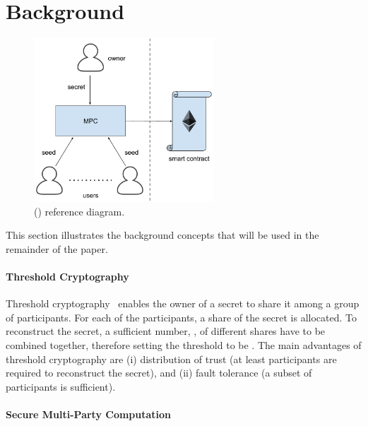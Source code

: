 \vspace*{-2pt}
\section{Background}\label{sect:background}

\begin{figure}[tp]
	\centering
	\includegraphics[width=0.6\textwidth]{fig/proposal}
	\caption{\name (\shortname) reference diagram.}
	\label{fig:model}
\end{figure}



This section illustrates the background concepts that will be used in the remainder of the paper.

\paragraph*{Threshold Cryptography}

Threshold cryptography~\cite{Shamir:1979:SS:359168.359176} enables the owner of a secret to share it among a group of participants. For each of the \N participants, a share of the secret is allocated. 
To reconstruct the secret, a sufficient number, \K, of different shares have to be combined together, therefore setting the threshold to be \KofN.
The main advantages of threshold cryptography are (i) distribution of trust (at least \K participants are required to reconstruct the secret), and (ii) fault tolerance (a subset of \K participants is sufficient).

\paragraph*{Secure Multi-Party Computation}

